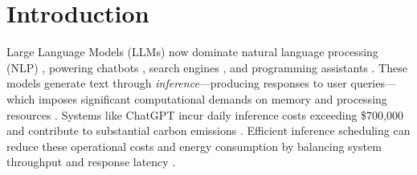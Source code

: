 \section{Introduction}

Large Language Models (LLMs) now dominate natural language processing (NLP) \citep{devlin2019bert, brown2020language, kaplan2020scaling, ouyang2022training, wei2022emergent, wei2022chain, touvron2023llama, openai2024gpt4technicalreport}, powering chatbots \citep{anthropic2023claude, bai2023qwen, openai2024gpt4technicalreport, deepseekai2025deepseekr1incentivizingreasoningcapability}, search engines \citep{google2023bard, microsoft2023bing}, and programming assistants \citep{copilot, claude_3_7}. These models generate text through \textit{inference}---producing responses to user queries---which imposes significant computational demands on memory and processing resources \citep{garcia2019estimation}. Systems like ChatGPT incur daily inference costs exceeding \$700,000 and contribute to substantial carbon emissions \citep{patel2023peeling, patterson2021carbon}. Efficient inference scheduling can reduce these operational costs and energy consumption \citep{strubell2019energy, desislavov2021compute} by balancing system throughput and response latency \citep{wu2022sustainable}.

